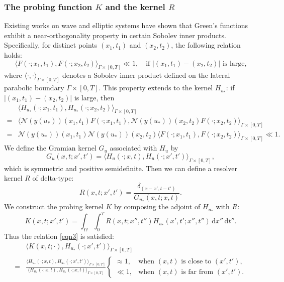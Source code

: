 \documentclass[onefignum,onetabnum]{siamart190516}
\numberwithin{equation}{section}
\begin{document}
\subsubsection{The probing function $K$ and the kernel $R$}
Existing works \cite{ItoJinZou:2012,ChowItoZou:2018sisc,ItoJinZou:2013,Zou2014,Zou2015,Zou2021,Zou2022} on wave and elliptic systems  have shown that Green's functions exhibit a near-orthogonality property in certain Sobolev inner products.
Specifically, for distinct points $(x_1,t_1)$ and $(x_2,t_2)$, the following relation holds:
\begin{equation}\label{eqn9}
\langle F(\cdot;x_1,t_1), F(\cdot;x_2,t_2) \rangle_{\Gamma \times [0,T]} \ll 1, \quad \text{if } |(x_1, t_1) - (x_2, t_2)| \text{ is large,}
\end{equation}
where $\langle \cdot,\cdot \rangle_{\Gamma \times [0,T]}$ denotes a Sobolev inner product defined on the lateral parabolic boundary $\Gamma\times[0,T]$.
This property extends to the kernel $H_{u_{*}}$: if $ |(x_1, t_1) - (x_2, t_2)|$ is large, then
\begin{align*}
{}&\langle H_{u_{*}}(\cdot;x_1,t_1), H_{u_{*}}(\cdot;x_2,t_2) \rangle_{\Gamma \times [0,T]} \\
=& \langle \mathcal{N}(y(u_{*}))(x_{1},t_{1})F(\cdot;x_1,t_1), \mathcal{N}(y(u_{*}))(x_{2},t_{2})F(\cdot;x_2,t_2) \rangle_{\Gamma \times [0,T]}\\
=&\mathcal{N}(y(u_{*}))(x_{1},t_{1})\mathcal{N}(y(u_{*}))(x_{2},t_{2})\langle F(\cdot;x_1,t_1), F(\cdot;x_2,t_2) \rangle_{\Gamma \times [0,T]}\ll 1.
\end{align*}
We define the Gramian kernel $G_{u}$ associated with $H_{u}$ by
\begin{equation} \label{eqn16}
G_{u}(x,t; x',t') = \langle H_{u}(\cdot;x,t), H_{u}(\cdot;x',t') \rangle_{\Gamma \times [0,T]},
\end{equation}
which is symmetric and positive semidefinite.
Then we can define a resolver kernel $R$ of delta-type:
\begin{equation*}
R(x,t; x',t') = \frac{\delta_{(x-x', t-t')}}{G_{u_{*}}(x,t; x,t)}.
\end{equation*}
We construct the probing kernel $K$ by composing the adjoint of $H_{u_{*}}$ with $R$:
\begin{equation}\label{eqn8}
K(x,t; x',t') = \int_{\Omega} \int_{0}^{T} R(x,t; x'',t'') H_{u_{*}}(x',t'; x'',t'') \, \mathrm{d}x'' \, \mathrm{d}t''.
\end{equation}
Thus the relation \eqref{eqn3} is satisfied:
\begin{align*}
&\langle K(x,t; \cdot), H_{u_{*}}(\cdot; x', t') \rangle_{\Gamma \times [0,T]}\\
= &\frac{\langle H_{u_{*}}(\cdot;x,t), H_{u_{*}}(\cdot;x',t') \rangle_{\Gamma \times [0,T]}}{\langle H_{u_{*}}(\cdot;x,t), H_{u_{*}}(\cdot;x,t) \rangle_{\Gamma \times [0,T]}}
\begin{cases}
\approx 1, & \text{when } (x,t) \text{ is close to } (x',t'), \\
\ll 1, & \text{when } (x,t) \text{ is far from } (x',t').
\end{cases}
\end{align*}
\end{document}
